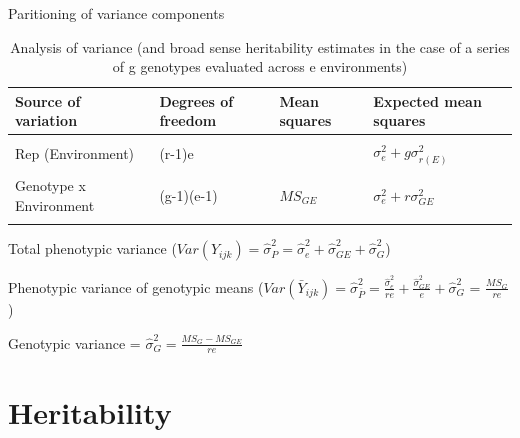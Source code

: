 \documentclass[11pt,ignorenonframetext,aspectratio=169]{beamer}
\begin{document}
\begin{frame}{Paritioning of variance components}
\protect\hypertarget{paritioning-of-variance-components}{}
\begin{table}

\caption{\label{tab:anova-var-partitioning}Analysis of variance (and broad sense heritability estimates in the case of a series of g genotypes evaluated across e environments)}
\centering
\fontsize{8}{10}\selectfont
\begin{tabular}[t]{>{\raggedright\arraybackslash}p{12em}>{\raggedright\arraybackslash}p{5em}>{\raggedright\arraybackslash}p{7em}>{\raggedright\arraybackslash}p{12em}}
\toprule
Source of variation & Degrees of freedom & Mean squares & Expected mean squares\\
\midrule
\cellcolor{gray!6}{Environment} & \cellcolor{gray!6}{e-1} & \cellcolor{gray!6}{} & \cellcolor{gray!6}{$\sigma^2 + g \sigma^2_{r(E)} + r \sigma^2_{GE} + rg \sigma^2_{E}$}\\
Rep (Environment) & (r-1)e &  & $\sigma^2_{e} + g \sigma^2_{r(E)}$\\
\cellcolor{gray!6}{Genotype} & \cellcolor{gray!6}{g-1} & \cellcolor{gray!6}{$MS_G$} & \cellcolor{gray!6}{$\sigma^2_e + r \sigma^2_{GE} + re \sigma^2_{G}$}\\
Genotype x Environment & (g-1)(e-1) & $MS_{GE}$ & $\sigma^2_{e} + r \sigma^2_{GE}$\\
\cellcolor{gray!6}{Error} & \cellcolor{gray!6}{(g-1)(r-1)e} & \cellcolor{gray!6}{$MS_{E}$} & \cellcolor{gray!6}{$\sigma^2_{e}$}\\
\bottomrule
\end{tabular}
\end{table}

Total phenotypic variance
(\(Var(Y_{ijk}) = \hat{\sigma}^2_{P} = \hat{\sigma}^2_{e} + \hat{\sigma}^2_{GE} + \hat{\sigma}^2_{G}\))

Phenotypic variance of genotypic means
(\(Var(\bar{Y}_{ijk}) = \hat{\sigma}^2_{\bar{P}} = \frac{\hat{\sigma}^2_{e}}{re} + \frac{\hat{\sigma}^2_{GE}}{e} + \hat{\sigma}^2_{G}\)
= \(\frac{MS_G}{re}\))

Genotypic variance = \(\hat{\sigma}^2_{G} = \frac{MS_G - MS_{GE}}{re}\)
\end{frame}

\hypertarget{heritability}{%
\section{Heritability}\label{heritability}}
\end{document}
